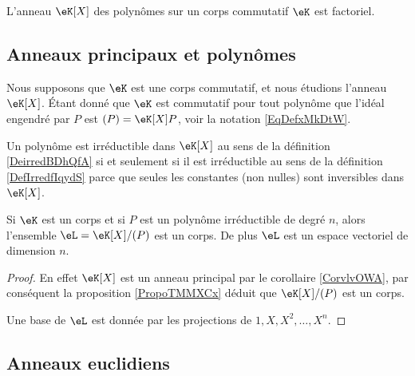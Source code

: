 \begin{proposition}     \label{PropqGZXvr}
    L'anneau \( \eK[X]\) des polynômes sur un corps commutatif \( \eK\) est factoriel.
\end{proposition}

\subsection{Anneaux principaux et polynômes}

Nous supposons que \( \eK\) est une corps commutatif, et nous étudions l'anneau \( \eK[X]\). Étant donné que \( \eK\) est commutatif pour tout polynôme que l'idéal engendré par \( P\) est \( (P)=\eK[X]P\), voir la notation \eqref{EqDefxMkDtW}.

\begin{remark}
    Un polynôme est irréductible dans \( \eK[X]\) au sens de la définition \ref{DeirredBDhQfA} si et seulement si il est irréductible au sens de la définition \ref{DefIrredfIqydS} parce que seules les constantes (non nulles) sont inversibles dans \( \eK[X]\).
\end{remark}

\begin{corollary}       \label{CorsLGiEN}
    Si \( \eK\) est un corps et si \( P\) est un polynôme irréductible de degré \( n\), alors l'ensemble \( \eL=\eK[X]/(P)\) est un corps. De plus \( \eL\) est un espace vectoriel de dimension \( n\).
\end{corollary}

\begin{proof}
    En effet \( \eK[X]\) est un anneau principal par le corollaire \ref{CorvlvOWA}, par conséquent la proposition \ref{PropoTMMXCx} déduit que \( \eK[X]/(P)\) est un corps.

    Une base de \( \eL\) est donnée par les projections de \( 1,X,X^2,\ldots, X^n\).
\end{proof}

\subsection{Anneaux euclidiens}

